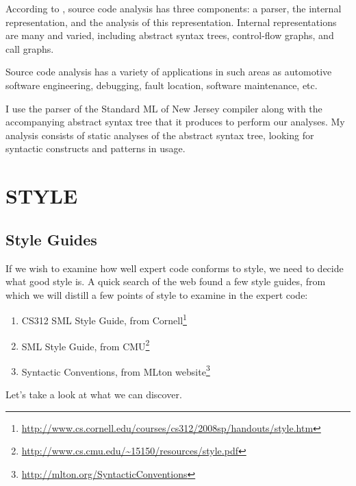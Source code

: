 \documentclass[12pt,abstracton]{scrartcl}
\begin{document}
According to \cite{Bin07}, source code analysis has three components: a parser,
the internal representation, and the analysis of this representation.
Internal representations are many and varied, including abstract syntax trees,
control-flow graphs, and call graphs.

Source code analysis has a variety of applications in such areas as
automotive software engineering, debugging, fault location, software maintenance,
etc.\cite{Bin07}

I use the parser of the Standard ML of New Jersey compiler along with the accompanying
abstract syntax tree that it produces to perform our analyses. My analysis
consists of static analyses of the abstract syntax tree, looking for
syntactic constructs and patterns in usage.
\section{STYLE}\label{sec:style}
\subsection{Style Guides}\label{subsec:guide}
If we wish to examine how well expert code conforms to style, we need to decide
what good style is. A quick search of the web found a few style guides, from which
we will distill a few points of style to examine in the expert code:
\begin{enumerate}
\item CS312 SML Style Guide, from Cornell\footnote{\url{http://www.cs.cornell.edu/courses/cs312/2008sp/handouts/style.htm}}
\item SML Style Guide, from CMU\footnote{\url{http://www.cs.cmu.edu/~15150/resources/style.pdf}}
\item Syntactic Conventions, from MLton website\footnote{\url{http://mlton.org/SyntacticConventions}}
\end{enumerate}
Let's take a look at what we can discover.
\end{document}

